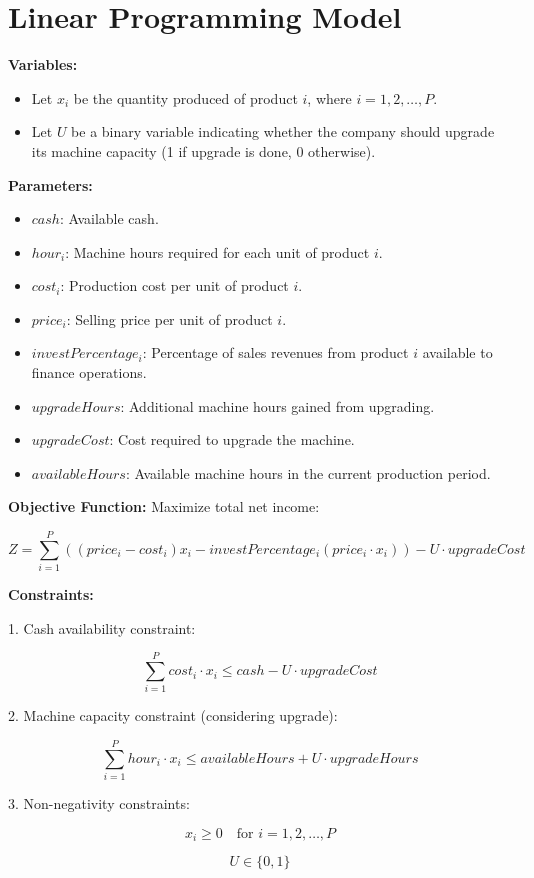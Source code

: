 \documentclass{article}
\begin{document}
\section*{Linear Programming Model}

\textbf{Variables:}
\begin{itemize}
    \item Let $x_i$ be the quantity produced of product $i$, where $i = 1, 2, \ldots, P$.
    \item Let $U$ be a binary variable indicating whether the company should upgrade its machine capacity (1 if upgrade is done, 0 otherwise).
\end{itemize}

\textbf{Parameters:}
\begin{itemize}
    \item $cash$: Available cash.
    \item $hour_i$: Machine hours required for each unit of product $i$.
    \item $cost_i$: Production cost per unit of product $i$.
    \item $price_i$: Selling price per unit of product $i$.
    \item $investPercentage_i$: Percentage of sales revenues from product $i$ available to finance operations.
    \item $upgradeHours$: Additional machine hours gained from upgrading.
    \item $upgradeCost$: Cost required to upgrade the machine.
    \item $availableHours$: Available machine hours in the current production period.
\end{itemize}

\textbf{Objective Function:}
Maximize total net income:

\[
Z = \sum_{i=1}^{P} \left( (price_i - cost_i) x_i - investPercentage_i (price_i \cdot x_i) \right) - U \cdot upgradeCost
\]

\textbf{Constraints:}

1. Cash availability constraint:

\[
\sum_{i=1}^{P} cost_i \cdot x_i \leq cash - U \cdot upgradeCost
\]

2. Machine capacity constraint (considering upgrade):

\[
\sum_{i=1}^{P} hour_i \cdot x_i \leq availableHours + U \cdot upgradeHours
\]

3. Non-negativity constraints:

\[
x_i \geq 0 \quad \text{for } i = 1, 2, \ldots, P
\]

\[
U \in \{0, 1\}
\]
\end{document}
